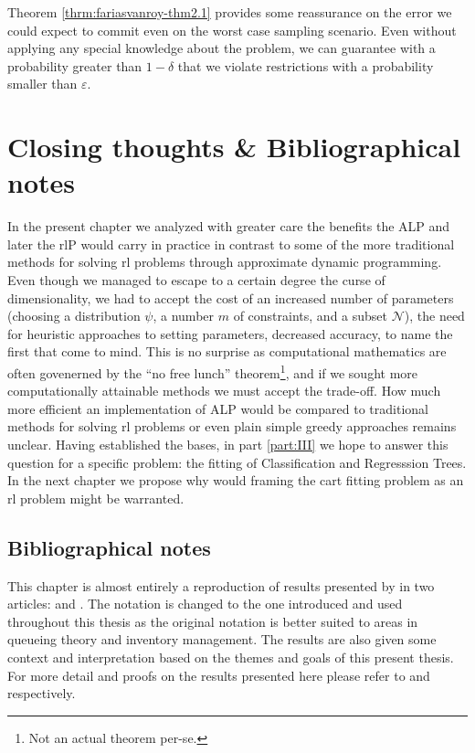 Theorem \ref{thrm:fariasvanroy-thm2.1} provides some reassurance on the error we
could expect to commit even on the worst case sampling scenario. Even without
applying any special knowledge about the problem, we can guarantee with a
probability greater than $1 - \delta$ that we violate restrictions with a
probability smaller than $\varepsilon$.

\section{Closing thoughts \& Bibliographical notes}

In the present chapter we analyzed with greater care the benefits the ALP and
later the \ac{rl}P would carry in practice in contrast to some of the more
traditional methods for solving \ac{rl} problems through approximate dynamic
programming. Even though we managed to escape to a certain degree the curse of
dimensionality, we had to accept the cost of an increased number of parameters
(choosing a distribution $\psi$, a number $m$ of constraints, and a subset
$\mathcal{N}$), the need for heuristic approaches to setting parameters,
decreased accuracy, to name the first that come to mind. This is no surprise as
computational mathematics are often govenerned by the ``no free lunch''
theorem\footnote{Not an actual theorem per-se.}, and if we sought more
computationally attainable methods we must accept the trade-off. How much more
efficient an implementation of ALP would be compared to traditional methods for
solving \ac{rl} problems or even plain simple greedy approaches remains unclear.
Having established the bases, in part \ref{part:III} we hope to answer this
question for a specific problem: the fitting of Classification and Regresssion
Trees. In the next chapter we propose why would framing the \ac{cart} fitting
problem as an \ac{rl} problem might be warranted.

\subsection{Bibliographical notes}

This chapter is almost entirely a reproduction of results presented by
\citeauthor{farias2003LP2ADP} in two articles:  and
. The notation is changed to the one introduced
and used throughout this thesis as the original notation is better suited to
areas in queueing theory and inventory management. The results are also given
some context and interpretation based on the themes and goals of this present
thesis. For more detail and proofs on the results presented here please refer to
\cite{farias2003LP2ADP} and \cite{farias2004constraint} respectively.